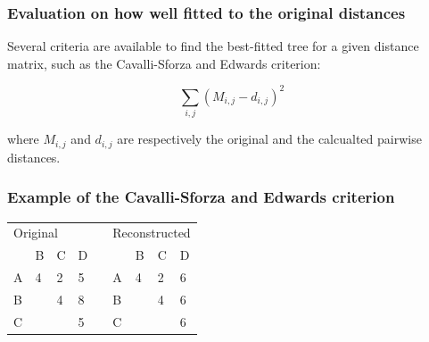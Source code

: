 %
%
\subsubsection*{Evaluation on how well fitted to the original distances}
Several criteria are available to find the best-fitted tree for a given distance matrix, such as the Cavalli-Sforza and Edwards criterion:

\[
\sum_{i,j}{}(M_{i,j} - d_{i,j})^2
\]

where $M_{i,j}$ and $d_{i,j}$ are respectively the original and the calcualted pairwise distances.

%
%
\subsubsection*{Example of the Cavalli-Sforza and Edwards criterion}

\begin{table}[H]
\centering
\begin{tabular}{lllllllll}
\multicolumn{4}{l}{Original}                                                                       &                       & \multicolumn{4}{l}{Reconstructed}                                                                 \\ \cline{1-4} \cline{6-9} 
\multicolumn{1}{|l|}{}  & \multicolumn{1}{l|}{B} & \multicolumn{1}{l|}{C} & \multicolumn{1}{l|}{D} & \multicolumn{1}{l|}{} & \multicolumn{1}{l|}{}  & \multicolumn{1}{l|}{B} & \multicolumn{1}{l|}{C} & \multicolumn{1}{l|}{D} \\ \cline{1-4} \cline{6-9} 
\multicolumn{1}{|l|}{A} & \multicolumn{1}{l|}{4} & \multicolumn{1}{l|}{2} & \multicolumn{1}{l|}{5} & \multicolumn{1}{l|}{} & \multicolumn{1}{l|}{A} & \multicolumn{1}{l|}{4} & \multicolumn{1}{l|}{2} & \multicolumn{1}{l|}{6} \\ \cline{1-4} \cline{6-9} 
\multicolumn{1}{|l|}{B} & \multicolumn{1}{l|}{}  & \multicolumn{1}{l|}{4} & \multicolumn{1}{l|}{8} & \multicolumn{1}{l|}{} & \multicolumn{1}{l|}{B} & \multicolumn{1}{l|}{}  & \multicolumn{1}{l|}{4} & \multicolumn{1}{l|}{6} \\ \cline{1-4} \cline{6-9} 
\multicolumn{1}{|l|}{C} & \multicolumn{1}{l|}{}  & \multicolumn{1}{l|}{}  & \multicolumn{1}{l|}{5} & \multicolumn{1}{l|}{} & \multicolumn{1}{l|}{C} & \multicolumn{1}{l|}{}  & \multicolumn{1}{l|}{}  & \multicolumn{1}{l|}{6} \\ \cline{1-4} \cline{6-9} 
\end{tabular}
\end{table}

